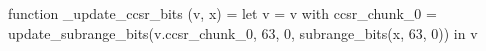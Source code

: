 function _update_ccsr_bits (v, x) = let v = { v with ccsr_chunk_0 = update_subrange_bits(v.ccsr_chunk_0, 63, 0, subrange_bits(x, 63, 0)) } in
  v

